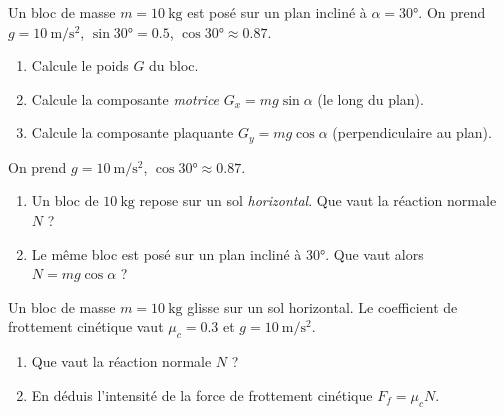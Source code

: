 \documentclass[11pt,a4paper]{article}
\newcommand{\vv}[1]{\vec{#1}}\newcommand{\ds}{\displaystyle}
\begin{document}

\begin{exo}
Un bloc de masse $m=\qty{10}{\kilogram}$ est posé sur un plan incliné à $\alpha=\ang{30}$. On prend
$g=\qty{10}{\metre\per\second\squared}$, $\sin\ang{30}=\num{0,5}$, $\cos\ang{30}\approx\num{0,87}$.
\begin{center}
\end{center}
\begin{enumerate}[label=\alph*)]
  \item Calcule le poids $G$ du bloc.
  \item Calcule la composante \emph{motrice} $G_x=mg\sin\alpha$ (le long du plan).
  \item Calcule la composante plaquante $G_y=mg\cos\alpha$ (perpendiculaire au plan).
\end{enumerate}
\end{exo}

\begin{exo}
On prend $g=\qty{10}{\metre\per\second\squared}$, $\cos\ang{30}\approx\num{0,87}$.
\begin{enumerate}[label=\alph*)]
  \item Un bloc de $\qty{10}{\kilogram}$ repose sur un sol \emph{horizontal}. Que vaut la réaction normale $N$ ?
  \item Le même bloc est posé sur un plan incliné à \ang{30}. Que vaut alors $N=mg\cos\alpha$ ?
\end{enumerate}
\end{exo}

\begin{exo}
Un bloc de masse $m=\qty{10}{\kilogram}$ glisse sur un sol horizontal. Le coefficient de frottement
cinétique vaut $\mu_c=\num{0,3}$ et $g=\qty{10}{\metre\per\second\squared}$.
\begin{enumerate}[label=\alph*)]
  \item Que vaut la réaction normale $N$ ?
  \item En déduis l'intensité de la force de frottement cinétique $F_f=\mu_c N$.
\end{enumerate}
\end{exo}
\end{document}
